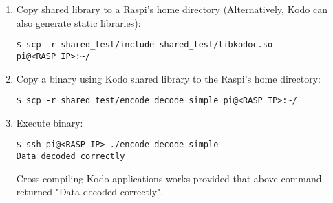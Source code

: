 \begin{enumerate}
\item Copy shared library to a \ac{Raspi}'s home directory (Alternatively, Kodo can also generate static libraries):
\begin{lstlisting}[]
$ scp -r shared_test/include shared_test/libkodoc.so pi@<RASP_IP>:~/
\end{lstlisting}
\FloatBarrier
\vspace{-5mm}

\item Copy a binary using Kodo shared library to the \ac{Raspi}'s home directory:
\begin{lstlisting}[]
$ scp -r shared_test/encode_decode_simple pi@<RASP_IP>:~/
\end{lstlisting}
\FloatBarrier
\vspace{-5mm}

\item Execute binary:
\begin{lstlisting}[]
$ ssh pi@<RASP_IP> ./encode_decode_simple
Data decoded correctly
\end{lstlisting}
\FloatBarrier
\vspace{-5mm}

Cross compiling Kodo applications works provided that above command
returned "Data decoded correctly".

%
%
%


\end{enumerate}

